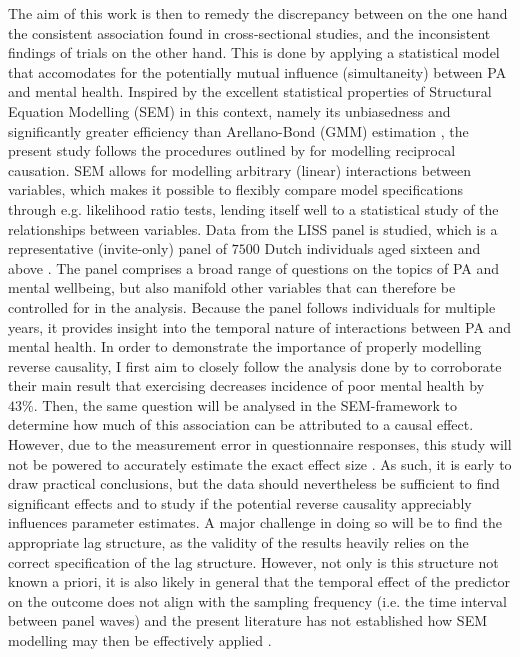 \documentclass[a4paper,11pt]{report}
\begin{document}
The aim of this work is then to remedy the discrepancy between on the one hand the consistent association found in
cross-sectional studies, and the inconsistent findings of trials on the other hand.
This is done by applying a statistical model that accomodates for the potentially mutual influence (simultaneity)
between PA and mental health. Inspired by the excellent statistical properties of Structural Equation Modelling (SEM)
in this context, namely its unbiasedness and significantly greater efficiency than Arellano-Bond (GMM) estimation
\cite{leszczensky2022deal}, the present study follows the procedures outlined by 
for modelling reciprocal causation.
SEM allows for modelling arbitrary (linear) interactions between variables, which makes it possible to flexibly compare
model specifications through e.g. likelihood ratio tests, lending itself well to a statistical study of the relationships
between variables.
Data from the LISS panel is studied, which is a representative (invite-only) panel of $7500$ Dutch individuals aged
sixteen and above \cite{scherpenzeel2010liss}. The panel comprises a broad range of questions on the topics of PA and
mental wellbeing, but also manifold other variables that can therefore be controlled for in the analysis.
Because the panel follows individuals for multiple years, it provides insight into the temporal nature of interactions
between PA and mental health.
In order to demonstrate the importance of properly modelling reverse causality, I first aim to closely follow
the analysis done by  to corroborate their main result that exercising decreases incidence
of poor mental health by $43\%$.
Then, the same question will be analysed in the SEM-framework to determine how much of this association can be attributed
to a causal effect. However, due to the measurement error in questionnaire responses, this study will not be powered
to accurately estimate the exact effect size \cite{pereira2014depressive}. As such, it is early to draw practical conclusions, but the data should nevertheless
be sufficient to find significant effects and to study if the potential reverse causality appreciably influences
parameter estimates.
A major challenge in doing so will be to find the appropriate lag structure, as the validity of the results heavily
relies on the correct specification of the lag structure. However, not only is this structure not known a priori,
it is also likely in general that the temporal effect of the predictor on the outcome does not align with the sampling
frequency (i.e. the time interval between panel waves) and the present literature has not established how SEM modelling
may then be effectively applied \cite{leszczensky2022deal}.
\end{document}

